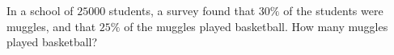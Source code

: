 In a school of $25000$ students, a survey found that $30\%$ of the students were muggles, and that $25\%$ of the muggles played basketball. How many muggles played basketball?
